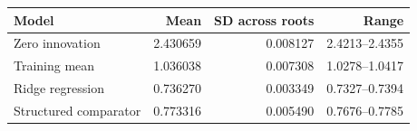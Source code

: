 \footnotesize\setlength{\tabcolsep}{3pt}\begin{tabular*}{\columnwidth}{@{\extracolsep{\fill}}lrrr}
\toprule
Model & Mean & SD across roots & Range \\
\midrule
Zero innovation & 2.430659 & 0.008127 & 2.4213--2.4355 \\
Training mean & 1.036038 & 0.007308 & 1.0278--1.0417 \\
Ridge regression & 0.736270 & 0.003349 & 0.7327--0.7394 \\
Structured comparator & 0.773316 & 0.005490 & 0.7676--0.7785 \\
\bottomrule
\end{tabular*}
